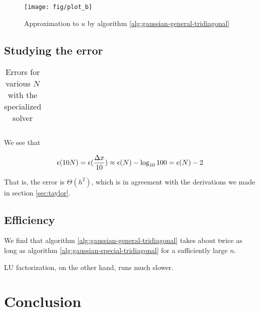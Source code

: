 \documentclass[a4paper]{article}
\begin{document}
\begin{figure}[ht]
\texttt{[image: fig/plot\_b]}
\caption{Approximation to $u$ by algorithm \ref{alg:gaussian-general-tridiagonal}}
\end{figure}

\subsection{Studying the error}

\begin{table}[htbp]
\begin{center}
\begin{tabular}{r r}
    
\end{tabular}
\caption{Errors for various $N$ with the specialized solver}
\end{center}
\end{table}

We see that

\begin{equation}
    \epsilon(10N) = \epsilon(\frac{{\Delta x}}{10}) \approx \epsilon(N) - \log_{10}{100} = \epsilon(N) - 2
\end{equation}

That is, the error is $\Theta(h^2)$, which is in agreement with the derivations we made in section \ref{sec:taylor}.

\subsection{Efficiency}
We find that algorithm \ref{alg:gaussian-general-tridiagonal} takes about twice as long as algorithm \ref{alg:gaussian-special-tridiagonal} for a sufficiently large $n$.

LU factorization, on the other hand, runs much slower.



\section{Conclusion}\label{sec:conclusion}

%
%

{}
\end{document}
